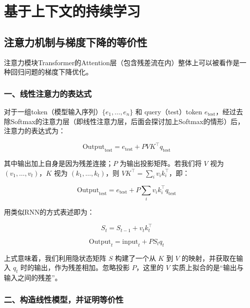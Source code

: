 \hypertarget{ux57faux4e8eux4e0aux4e0bux6587ux7684ux6301ux7eedux5b66ux4e60}{%
\chapter{基于上下文的持续学习}\label{ux57faux4e8eux4e0aux4e0bux6587ux7684ux6301ux7eedux5b66ux4e60}}

\hypertarget{ux6ce8ux610fux529bux673aux5236ux4e0eux68afux5ea6ux4e0bux964dux7684ux7b49ux4ef7ux6027}{%
\section{注意力机制与梯度下降的等价性}\label{ux6ce8ux610fux529bux673aux5236ux4e0eux68afux5ea6ux4e0bux964dux7684ux7b49ux4ef7ux6027}}

注意力模块Transformer的Attention层（包含残差流在内）整体上可以被看作是一种回归问题的梯度下降优化。

\hypertarget{ux4e00ux7ebfux6027ux6ce8ux610fux529bux7684ux8868ux8fbeux5f0f}{%
\subsection{一、线性注意力的表达式}\label{ux4e00ux7ebfux6027ux6ce8ux610fux529bux7684ux8868ux8fbeux5f0f}}

对于一组token（模型输入序列）\(\{e_1,\ldots,e_n\}\) 和 query（test）token \(e_{\mathrm{test}}\)，经过去除Softmax的注意力层（即线性注意力层，后面会探讨加上Softmax的情形）后，注意力的表达式为：

\[
\mathrm{Output}_{\mathrm{test}}=e_{\mathrm{test}}+PVK^\top q_{\mathrm{test}}
\tag{1}
\]

其中输出加上自身是因为残差连接；\(P\) 为输出投影矩阵。若我们将 \(V\) 视为 \((v_1,\ldots,v_t)\)，\(K\) 视为 \((k_1,\ldots,k_t)\)，则 \(VK^\top=\sum_i v_i k_i^\top\)，即：

\[
\mathrm{Output}_{\mathrm{test}}=e_{\mathrm{test}}+P\sum_i v_i k_i^\top q_{\mathrm{test}}
\tag{2}
\]

用类似RNN的方式表述即为：

\[
S_t=S_{t-1}+v_t k_t^\top
\]

\[
\mathrm{Output}_t=\mathrm{input}_t+PS_tq_t
\]

上式意味着，我们利用隐状态矩阵 \(S\) 构建了一个从 \(K\) 到 \(V\) 的映射，并获取在输入 \(q_t\) 时的输出，作为残差相加。忽略投影 \(P\)，这里的 \(V\) 实质上拟合的是``输出与输入之间的残差''。

\hypertarget{ux4e8cux6784ux9020ux7ebfux6027ux6a21ux578bux5e76ux8bc1ux660eux7b49ux4ef7ux6027}{%
\subsection{二、构造线性模型，并证明等价性}\label{ux4e8cux6784ux9020ux7ebfux6027ux6a21ux578bux5e76ux8bc1ux660eux7b49ux4ef7ux6027}}

